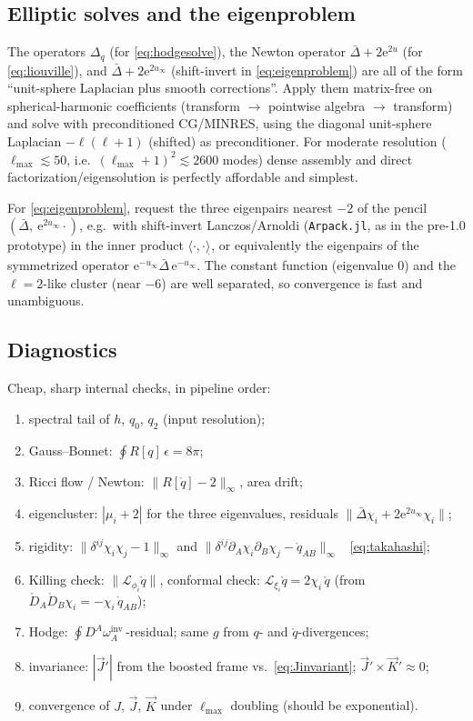 \documentclass[11pt]{article}
\newcommand{\ee}{\mathrm{e}}
\newcommand{\Lie}{\mathcal{L}}
\newcommand{\qo}{\mathring{q}}          %
\newcommand{\Do}{\mathring{D}}          %
\newcommand{\vJ}{\vec{J}}
\newcommand{\vK}{\vec{K}}
\begin{document}
\subsection{Elliptic solves and the eigenproblem}

The operators $\Delta_q$ (for \eqref{eq:hodgesolve}), the Newton operator
$\bar\Delta + 2\ee^{2u}$ (for \eqref{eq:liouville}), and $\bar\Delta + 2
\ee^{2u_\infty}$ (shift-invert in \eqref{eq:eigenproblem}) are all of the
form ``unit-sphere Laplacian plus smooth corrections''.  Apply them
matrix-free on spherical-harmonic coefficients (transform $\to$ pointwise
algebra $\to$ transform) and solve with preconditioned CG/MINRES, using the
diagonal unit-sphere Laplacian $-\ell(\ell+1)$ (shifted) as preconditioner.
For moderate resolution ($\ell_{\max}\lesssim 50$, i.e.\
$(\ell_{\max}+1)^2 \lesssim 2600$ modes) dense assembly and direct
factorization/eigensolution is perfectly affordable and simplest.

For \eqref{eq:eigenproblem}, request the three eigenpairs nearest $-2$ of
the pencil $(\bar\Delta,\ \ee^{2u_\infty}\!\cdot)$, e.g.\ with shift-invert
Lanczos/Arnoldi (\texttt{Arpack.jl}, as in the pre-1.0 prototype) in the
inner product $\langle\cdot,\cdot\rangle_{\mathring{}}$, or equivalently the
eigenpairs of the symmetrized operator
$\ee^{-u_\infty}\bar\Delta\,\ee^{-u_\infty}$.  The constant function
(eigenvalue $0$) and the $\ell=2$-like cluster (near $-6$) are well
separated, so convergence is fast and unambiguous.

\subsection{Diagnostics}

Cheap, sharp internal checks, in pipeline order:
\begin{enumerate}
\item spectral tail of $h$, $q_0$, $q_2$ (input resolution);
\item Gauss--Bonnet: $\oint R[q]\,\epsilon = 8\pi$;
\item Ricci flow / Newton: $\lVert R[\qo]-2\rVert_\infty$, area drift;
\item eigencluster: $|\mu_i + 2|$ for the three eigenvalues, residuals
  $\lVert\bar\Delta\chi_i + 2\ee^{2u_\infty}\chi_i\rVert$;
\item rigidity: $\lVert \delta^{ij}\chi_i\chi_j - 1\rVert_\infty$ and
  $\lVert \delta^{ij}\partial_A\chi_i\partial_B\chi_j -
  \qo_{AB}\rVert_\infty$ \ \eqref{eq:takahashi};
\item Killing check: $\lVert \Lie_{\phi_i}\qo \rVert$, conformal check:
  $\Lie_{\xi_i}\qo = 2\chi_i\,\qo$ (from
  $\Do_A\Do_B\chi_i = -\chi_i\,\qo_{AB}$);
\item Hodge: $\oint D^A\omega^{\mathrm{inv}}_A\,$-residual; same $g$ from
  $q$- and $\qo$-divergences;
\item invariance: $|\vJ'|$ from the boosted frame vs.\
  \eqref{eq:Jinvariant}; $\vJ'\times\vK'\approx 0$;
\item convergence of $J$, $\vJ$, $\vK$ under $\ell_{\max}$ doubling
  (should be exponential).
\end{enumerate}
\end{document}
